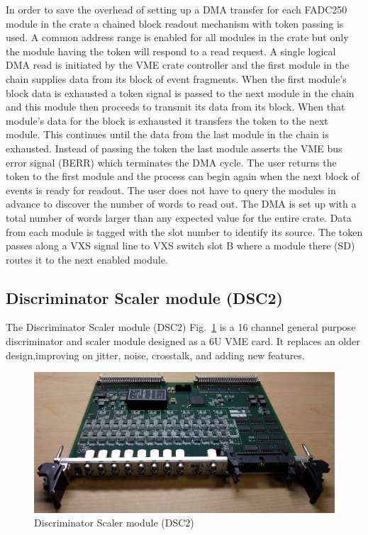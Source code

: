 In order to save the overhead of setting up a DMA transfer for each FADC250 module in the crate a chained block readout mechanism with token passing is used.  A common address range is enabled for all modules in the crate but only the module having the token will respond to a read request.  A single logical DMA read is initiated by the VME crate controller and the first module in the chain supplies data from its block of event fragments.  When the first module’s block data is exhausted a token signal is passed to the next module in the chain and this module then proceeds to transmit its data from its block.  When that module’s data for the block is exhausted it transfers the token to the next module.  This continues until the data from the last module in the chain is exhausted.  Instead of passing the token the last module asserts the VME bus error signal (BERR) which terminates the DMA cycle.  The user returns the token to the first module and the process can begin again when the next block of events is ready for readout.  The user does not have to query the modules in advance to discover the number of words to read out.  The DMA is set up with a total number of words larger than any expected value for the entire crate.  Data from each module is tagged with the slot number to identify its source.  The token passes along a VXS signal line to VXS switch slot B where a module there (SD) routes it to the next enabled module.


\subsection{Discriminator Scaler module (DSC2)}

The Discriminator Scaler module (DSC2) Fig.~\ref{fig:dsc2_board} is a 16 channel general purpose discriminator and scaler module designed as a 6U VME card. It replaces an older design,improving on jitter, noise, crosstalk, and adding new features.

\begin{figure}[hbt]
	\centering
	\includegraphics[width=1.0\columnwidth,keepaspectratio]{img/dsc2_board.png}
	\caption{Discriminator Scaler module (DSC2)}
	\label{fig:dsc2_board}
\end{figure}

